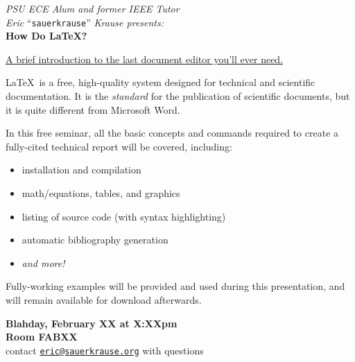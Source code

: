 \documentclass{article}
\begin{document}
    \begin{center} \LARGE
        \vspace*{.5in}
        \textit{PSU ECE Alum and former IEEE Tutor}\\
        \textit{Eric} ``\texttt{sauerkrause}'' \textit{Krause presents:}\\ \vspace{.45in}
        {\Huge \bf How Do \LaTeX?}\\\vspace{.35in}
    
        \LARGE\underline{A brief introduction to the last document editor you'll ever need.}\vspace{.2in}
    \end{center}

    \Large\LaTeX\ is a  free, high-quality system designed for technical and scientific documentation. It is the \emph{standard} for the publication of scientific documents, but it is quite different from Microsoft Word.\vspace{.2in}

    In this free seminar, all the basic concepts and commands required to create a fully-cited technical report will be covered, including:
    \begin{itemize}
        \item installation and compilation
        \item math/equations, tables, and graphics
        \item listing of source code (with syntax highlighting)
        \item automatic bibliography generation
        \item \emph{and more!}
    \end{itemize}\vspace{.2in}

    Fully-working examples will be provided and used during this presentation, and will remain available for download afterwards. 
  
    \begin{center} \Huge
        \textbf{Blahday, February XX at X:XXpm\\Room FABXX\\}\vspace{.2in}
        \Large contact \texttt{\href{mailto:eric@sauerkrause.org}{eric@sauerkrause.org}} with questions
    \end{center}
\end{document}
